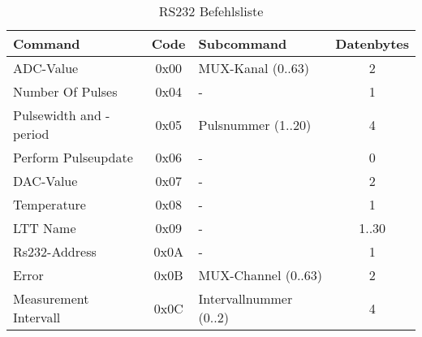 \begin{table}[H]
\begin{center}
\begin{tabularx}{\textwidth}{|X|c|X|c|}\hline 
 Command & Code & Subcommand & Datenbytes \\ \hline
 ADC-Value & 0x00 & MUX-Kanal (0..63) & 2  \\ \hline
 Number Of Pulses & 0x04 & - & 1  \\ \hline
 Pulsewidth and -period & 0x05 & Pulsnummer (1..20) & 4  \\ \hline
 Perform Pulseupdate & 0x06 & - & 0   \\ \hline
 DAC-Value & 0x07 & - & 2 \\ \hline
 Temperature & 0x08 & - & 1  \\ \hline
 LTT Name & 0x09 & - & 1..30  \\ \hline
 Rs232-Address & 0x0A & - & 1 \\ \hline
 Error & 0x0B & MUX-Channel (0..63) & 2  \\ \hline
 Measurement Intervall & 0x0C & Intervallnummer (0..2) & 4 \\ \hline
\end{tabularx}
\caption{RS232 Befehlsliste}
\label{table_RS232Commands}
\end{center}
\end{table}